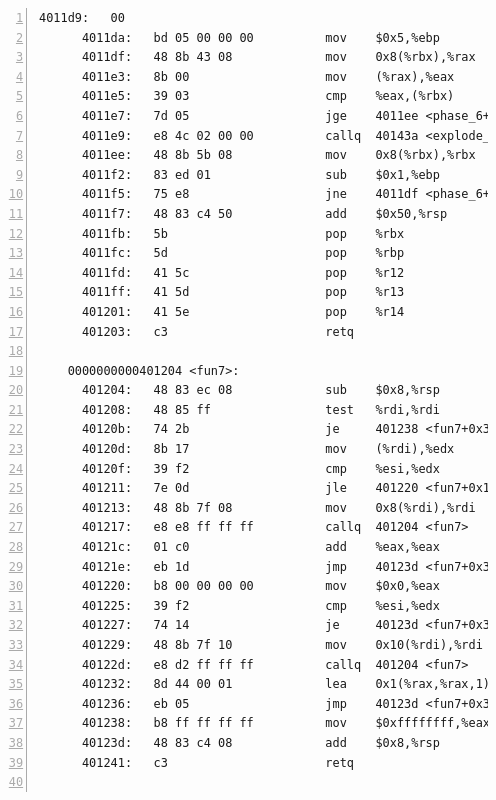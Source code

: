 \documentclass{article}
\begin{document}
\begin{lstlisting}[title = bomb的反汇编代码及部分注释, xleftmargin = 2em,xrightmargin = 2em, aboveskip = 1em, numbers = left, basicstyle=\scriptsize\ttfamily, numberstyle=\scriptsize]
      4011d9:	00 
      4011da:	bd 05 00 00 00       	mov    $0x5,%ebp					; %ebp = 5;
      4011df:	48 8b 43 08          	mov    0x8(%rbx),%rax				; %rax = M[%rbx + 8];
      4011e3:	8b 00                	mov    (%rax),%eax					; %eax = M[%rax];
      4011e5:	39 03                	cmp    %eax,(%rbx)					; if (M[%rbx] >= %eax)
      4011e7:	7d 05                	jge    4011ee <phase_6+0xfa>		;	  goto #589;
      4011e9:	e8 4c 02 00 00       	callq  40143a <explode_bomb>		; explode_bomb(...);
      4011ee:	48 8b 5b 08          	mov    0x8(%rbx),%rbx				; %rbx = M[%rbx + 8];
      4011f2:	83 ed 01             	sub    $0x1,%ebp					; %ebp--;
      4011f5:	75 e8                	jne    4011df <phase_6+0xeb>		; goto #584;
      4011f7:	48 83 c4 50          	add    $0x50,%rsp					; %rsp += 0x50;
      4011fb:	5b                   	pop    %rbx
      4011fc:	5d                   	pop    %rbp
      4011fd:	41 5c                	pop    %r12
      4011ff:	41 5d                	pop    %r13
      401201:	41 5e                	pop    %r14
      401203:	c3                   	retq   
    
    0000000000401204 <fun7>:
      401204:	48 83 ec 08          	sub    $0x8,%rsp					; %rsp -= 0x8;
      401208:	48 85 ff             	test   %rdi,%rdi					; if (%rdi == 0)
      40120b:	74 2b                	je     401238 <fun7+0x34>			;    goto #618;
      40120d:	8b 17                	mov    (%rdi),%edx					; %edx = M[%rdi];
      40120f:	39 f2                	cmp    %esi,%edx					; if (%edx <= %esi)
      401211:	7e 0d                	jle    401220 <fun7+0x1c>			;	  goto #611;
      401213:	48 8b 7f 08          	mov    0x8(%rdi),%rdi				; %rdi = M[%rdi + 0x8];
      401217:	e8 e8 ff ff ff       	callq  401204 <fun7>				; fun7(%rdi, %rsi);
      40121c:	01 c0                	add    %eax,%eax					; %eax += %eax;
      40121e:	eb 1d                	jmp    40123d <fun7+0x39>			; goto #619;
      401220:	b8 00 00 00 00       	mov    $0x0,%eax					; %eax = 0;
      401225:	39 f2                	cmp    %esi,%edx					; if (%edx == %esi)
      401227:	74 14                	je     40123d <fun7+0x39>			;     goto #619;
      401229:	48 8b 7f 10          	mov    0x10(%rdi),%rdi				; %rdi = M[%rdi + 0x10];
      40122d:	e8 d2 ff ff ff       	callq  401204 <fun7>				; fun7(%rdi, %rsi);
      401232:	8d 44 00 01          	lea    0x1(%rax,%rax,1),%eax		; %eax = 2 * %rax + 1;
      401236:	eb 05                	jmp    40123d <fun7+0x39>			; goto #619;
      401238:	b8 ff ff ff ff       	mov    $0xffffffff,%eax				; %eax = -1;
      40123d:	48 83 c4 08          	add    $0x8,%rsp					; %rsp += 0x8;
      401241:	c3                   	retq								; return %rax;
    

\end{lstlisting}
\end{document}
